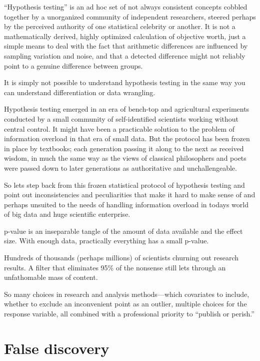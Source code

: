 \documentclass[
  letterpaper,
  DIV=11,
  numbers=noendperiod,
  oneside]{scrreprt}
\begin{document}
``Hypothesis testing'' is an ad hoc set of not always consistent
concepts cobbled together by a unorganized community of independent
researchers, steered perhaps by the perceived authority of one
statistical celebrity or another. It is not a mathematically derived,
highly optimized calculation of objective worth, just a simple means to
deal with the fact that arithmetic differences are influenced by
sampling variation and noise, and that a detected difference might not
reliably point to a genuine difference between groups.

It is simply not possible to understand hypothesis testing in the same
way you can understand differentiation or data wrangling.

Hypothesis testing emerged in an era of bench-top and agricultural
experiments conducted by a small community of self-identified scientists
working without central control. It might have been a practicable
solution to the problem of information overload in that era of small
data. But the protocol has been frozen in place by textbooks; each
generation passing it along to the next as received wisdom, in much the
same way as the views of classical philosophers and poets were passed
down to later generations as authoritative and unchallengeable.

So lets step back from this frozen statistical protocol of hypothesis
testing and point out inconsistencies and peculiarities that make it
hard to make sense of and perhaps unsuited to the needs of handling
information overload in todays world of big data and huge scientific
enterprise.

p-value is an inseparable tangle of the amount of data available and the
effect size. With enough data, practically everything has a small
p-value.

Hundreds of thousands (perhaps millions) of scientists churning out
research results. A filter that eliminates 95\% of the nonsense still
lets through an unfathomable mass of content.

So many choices in research and analysis methods---which covariates to
include, whether to exclude an inconvenient point as an outlier,
multiple choices for the response variable, all combined with a
professional priority to ``publish or perish.''

\hypertarget{false-discovery}{%
\section{False discovery}\label{false-discovery}}
\end{document}
